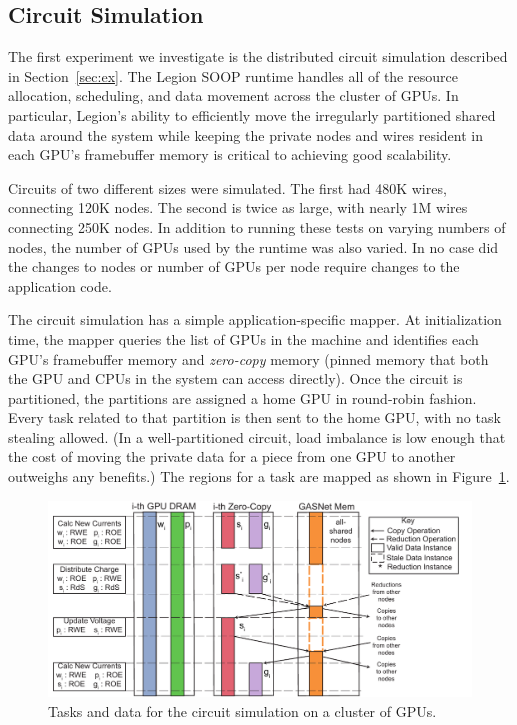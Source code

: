 \subsection{Circuit Simulation}
\label{subsec:exp_ckt}

The first experiment we investigate is the distributed circuit simulation described in 
Section~\ref{sec:ex}.  The Legion SOOP runtime handles all of the resource allocation, 
scheduling, and data movement across the cluster of GPUs.  In particular,  
Legion's ability to efficiently move the irregularly partitioned
shared data around the system while keeping the private nodes and wires resident in
each GPU's framebuffer memory is critical to achieving good scalability.

Circuits of two different sizes were simulated.  The first had 480K wires, connecting
120K nodes.  The second is twice as large, with nearly 1M wires connecting 
250K nodes.  In addition to running these tests on varying numbers of
nodes, the number of GPUs used by the runtime was also varied.  In no case did the 
changes to nodes or number of GPUs per node require changes to the application code.

The circuit simulation has a simple application-specific mapper.  At initialization
time, the mapper queries the list of GPUs in the machine and identifies each GPU's
framebuffer memory and {\em zero-copy} memory (pinned memory that both the GPU and
CPUs in the system can access directly).  Once the circuit is partitioned, the partitions
are assigned a home GPU in round-robin fashion.  Every task related to that partition is
then sent to the home GPU, with no task stealing allowed.  
%
%
(In a well-partitioned circuit,
load imbalance is low enough that the cost of moving the private data for a piece from one
GPU to another outweighs any benefits.)
%
  The regions for a task are mapped as 
shown in Figure~\ref{fig:gpumapping}.

\begin{figure}
\includegraphics[scale=0.48]{figs/CircuitMem.pdf}
\caption{Tasks and data for the circuit simulation on a cluster of GPUs.}
\label{fig:gpumapping}
\end{figure}

